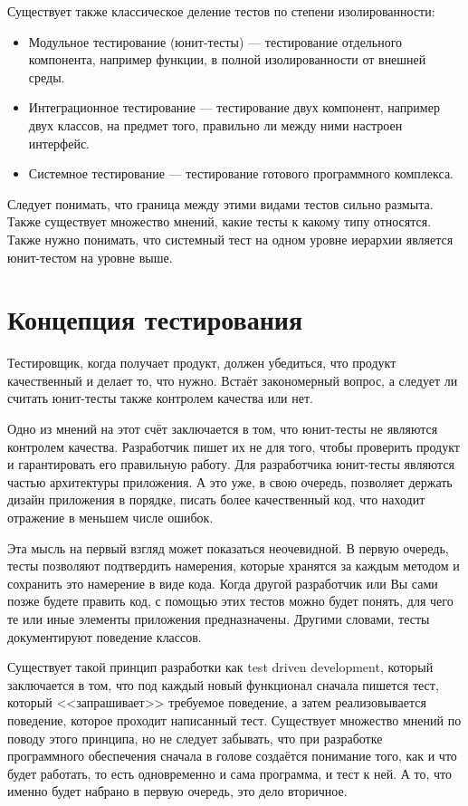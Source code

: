 Существует также классическое деление тестов по степени изолированности:
\begin{itemize}
  \item Модульное тестирование (юнит-тесты) --- тестирование отдельного компонента, например функции, в полной изолированности от внешней среды.
  \item Интеграционное тестирование --- тестирование двух компонент, например двух классов, на предмет того, правильно ли между ними настроен интерфейс.
  \item Системное тестирование --- тестирование готового программного комплекса.
\end{itemize}
Следует понимать, что граница между этими видами тестов сильно размыта. Также существует множество мнений, какие тесты к какому типу относятся. Также нужно понимать, что системный тест на одном уровне иерархии является юнит-тестом на уровне выше.

\section{Концепция тестирования}
Тестировщик, когда получает продукт, должен убедиться, что продукт качественный и делает то, что нужно. Встаёт закономерный вопрос, а следует ли считать юнит-тесты также контролем качества или нет.

Одно из мнений на этот счёт заключается в том, что юнит-тесты не являются контролем качества. Разработчик пишет их не для того, чтобы проверить продукт и гарантировать его правильную работу. Для разработчика юнит-тесты являются частью архитектуры приложения. А это уже, в свою очередь, позволяет держать дизайн приложения в порядке, писать более качественный код, что находит отражение в меньшем числе ошибок.

Эта мысль на первый взгляд может показаться неочевидной. В первую очередь, тесты позволяют подтвердить намерения, которые хранятся за каждым методом и сохранить это намерение в виде кода. Когда другой разработчик или Вы сами позже будете править код, с помощью этих тестов можно будет понять, для чего те или иные элементы приложения предназначены. Другими словами, тесты документируют поведение классов.

Существует такой принцип разработки как test driven development, который заключается в том, что под каждый новый функционал сначала пишется тест, который <<запрашивает>> требуемое поведение, а затем реализовывается поведение, которое проходит написанный тест. Существует множество мнений по поводу этого принципа, но не следует забывать, что при разработке программного обеспечения сначала в голове создаётся понимание того, как и что будет работать, то есть одновременно и сама программа, и тест к ней. А то, что именно будет набрано в первую очередь, это дело вторичное.

